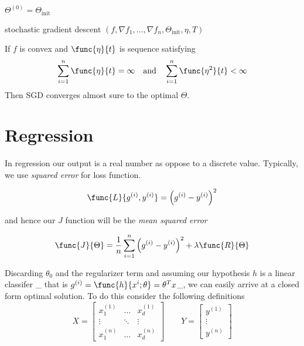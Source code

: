 \begin{algorithm}[H]
    \DontPrintSemicolon
    $\Theta^{(0)} = \Theta_{\mathrm{init}} $\;

    \Return{$\theta $}
    \caption{stochastic gradient descent $(f, \nabla f_1 , \dots,  \nabla f_n, \Theta_{\mathrm{init}} , \eta , T )$}
\end{algorithm}

\begin{theorem}
    If \(f\) is convex and \(\func{\eta}{t}\) is sequence satisfying 
    \begin{equation*}
        \sum_{i= 1}^n \func{\eta}{t} = \infty \quad \mathrm{and} \quad \sum_{i= 1}^n \func{\eta^2}{t} < \infty
    \end{equation*}
    Then SGD converges almost sure to the optimal \(\Theta\).
\end{theorem}

\section{Regression}
In regression our output is a real number as oppose to a discrete value. Typically, we use \textit{squared error} for loss function.

\begin{equation*}
    \func{L}{g^{(i)}, y^{(i)}} = \left(g^{(i)} - y^{(i)}\right)^2
\end{equation*}

and hence our \(J\) function will be the \textit{mean squared error} 

\begin{equation*}
    \func{J}{\Theta} = \dfrac{1}{n} \sum_{i = 1}^n \left( g^{(i)} - y^{(i)} \right)^2 + \lambda \func{R}{\Theta}
\end{equation*}

Discarding \(\theta_0\) and the regularizer term and assuming our hypothesis \(h\) is a linear classifer \_ that is \(g^{(i)} = \func{h}{x^{i}; \theta} = \theta^T x\)\_, we can easily arrive at a closed form optimal solution. To do this consider the following definitions 
\begin{equation*}
    X = \begin{bmatrix}
        x^{(1)}_1 & \dots & x^{(1)}_d \\
        \vdots & \ddots & \vdots\\
        x^{(n)}_1 & \dots & x^{(n)}_d
    \end{bmatrix} \qquad Y = \begin{bmatrix}
        y^{(1)}\\
        \vdots \\
        y^{(n)} 
    \end{bmatrix}
\end{equation*}

